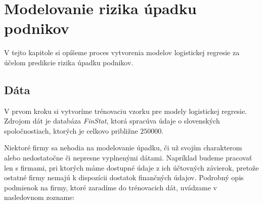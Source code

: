 \section{Modelovanie rizika úpadku podnikov}

V tejto kapitole si opíšeme proces vytvorenia modelov logistickej regresie za účelom predikcie rizika úpadku podnikov.

\subsection{Dáta}

V prvom kroku si vytvoríme trénovaciu vzorku pre modely logistickej regresie.
Zdrojom dát je databáza \emph{FinStat}, ktorá spracúva údaje o slovenských spoločnostiach, ktorých je celkovo približne \(250000\).

Niektoré firmy sa nehodia na modelovanie úpadku, či už svojím charakterom alebo nedostatočne či nepresne vyplnenými dátami.
Napríklad budeme pracovať len s firmami, pri ktorých máme dostupné údaje z ich účtovných závierok, pretože ostatné firmy nemajú k dispozícii dostatok finančných údajov.
Podrobný opis podmienok na firmy, ktoré zaradíme do trénovacich dát, uvádzame v nasledovnom zozname:

